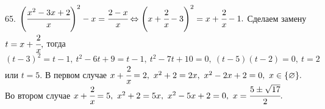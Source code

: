 65. $\left(\cfrac{x^2-3x+2}{x}\right)^2-x=\cfrac{2-x}{x}\Leftrightarrow\left(x+\cfrac{2}{x}-3\right)^2=x+\cfrac{2}{x}-1.$ Сделаем замену $t=x+\cfrac{2}{x},$ тогда
$(t-3)^2=t-1,\ t^2-6t+9=t-1,\ t^2-7t+10=0,\ (t-5)(t-2)=0,\ t=2$ или $t=5.$ В первом случае $x+\cfrac{2}{x}=2,\ x^2+2=2x,\ x^2-2x+2=0,\ x\in\{\varnothing\}.$ Во втором случае $x+\cfrac{2}{x}=5,\ x^2+2=5x,\ x^2-5x+2=0,\ x=\cfrac{5\pm\sqrt{17}}{2}.$\\
